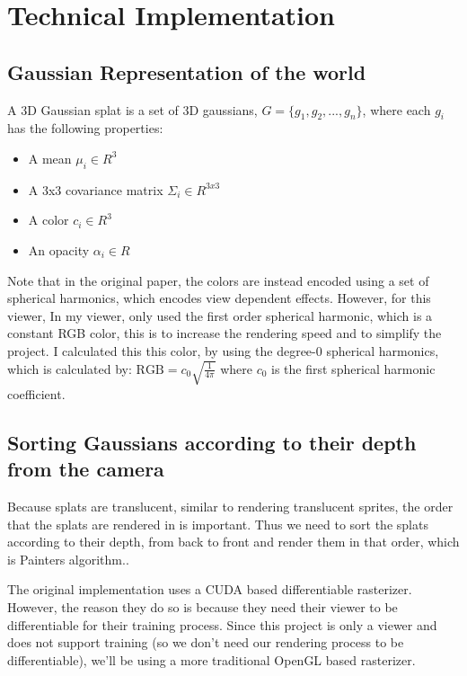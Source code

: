 \documentclass {article}
\begin{document}
\section{Technical Implementation}
\subsection{Gaussian Representation of the world}

     A 3D Gaussian splat is a set of 3D gaussians, $G = \{g_1, g_2, ..., g_n\}$, where each $g_i$ has the following properties:
     \begin{itemize}
     \item A mean $\mu_i \in R^3$
     \item A 3x3 covariance matrix $\Sigma_i \in R^{3x3}$
     \item A color $c_i \in R^3$
     \item An opacity $\alpha_i \in R$
     \end{itemize}

     Note that in the original paper, the colors are instead encoded using a set of spherical harmonics, which encodes view dependent effects. However, for this viewer, In my viewer, only used the first order spherical harmonic, which is a constant RGB color, this is to increase the rendering speed and to simplify the project. I calculated this this color, by using the degree-0 spherical harmonics, which is calculated by:
     $\text{RGB} = c_0 \sqrt{\frac{1}{4\pi}}$
     where $c_0$ is the first spherical harmonic coefficient.
     \\

     
     \subsection{Sorting Gaussians according to their depth from the camera}
     Because splats are translucent, similar to rendering translucent sprites, the order that the splats are rendered in is important. Thus we need to sort the splats according to their depth, from back to front and render them in that order, which is Painters algorithm..

     The original implementation uses a CUDA based differentiable rasterizer. However, the reason they do so is because they need their viewer to be differentiable for their training process. Since this project is only a viewer and does not support training (so we don't need our rendering process to be differentiable), we'll be using a more traditional OpenGL based rasterizer.
\end{document}
